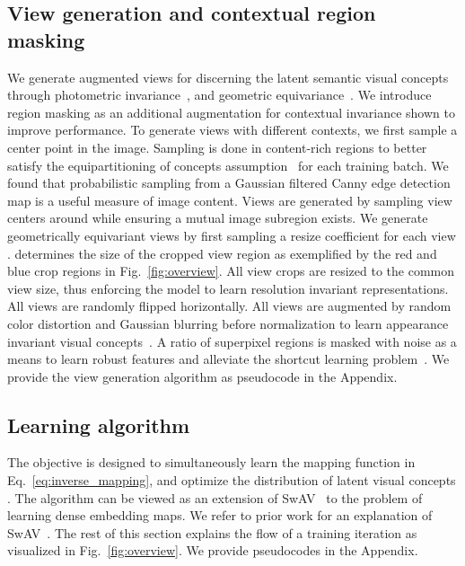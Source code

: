 \documentclass{bmvc2k}
\begin{document}
\subsection{View generation and contextual region masking}
\label{sec:view_generation}
We generate augmented views for discerning the latent semantic visual concepts through photometric invariance~\cite{Chen2020SimCLR}, and geometric equivariance~\cite{Cho2021PiCIE}. We introduce region masking as an additional augmentation for contextual invariance shown to improve performance.
To generate views with different contexts, we first sample a center point  in the image. Sampling is done in content-rich regions to better satisfy the equipartitioning of concepts assumption~\cite{Asano2020SeLA, Caron2020SwAV} for each training batch. We found that probabilistic sampling from a Gaussian filtered Canny edge detection map\cite{Canny1986CannyEdge} is a useful measure of image content. Views  are generated by sampling  view centers  around  while ensuring a mutual image subregion exists.
We generate geometrically equivariant views by first sampling a resize coefficient  for each view .  determines the size of the cropped view region as exemplified by the red and blue crop regions in Fig.~\ref{fig:overview}. All view crops are resized to the common view size, thus enforcing the model to learn resolution invariant representations. All views are randomly flipped horizontally.
All views are augmented by random color distortion and Gaussian blurring before normalization to learn appearance invariant visual concepts~\cite{Chen2020SimCLR, Xiao2021WhatShouldNot, Wen2021TowardUnderstanding}. A ratio of superpixel regions is masked with noise as a means to learn robust features and alleviate the shortcut learning problem~\cite{Geirhos2020ShortcutLearning}. We provide the view generation algorithm as pseudocode in the Appendix.

\subsection{Learning algorithm}

The objective  is designed to simultaneously learn the mapping function  in Eq.~\ref{eq:inverse_mapping}, and optimize the distribution of latent visual concepts . The algorithm can be viewed as an extension of SwAV~\cite{Caron2020SwAV} to the problem of learning dense embedding maps. We refer to prior work for an explanation of SwAV~\cite{Caron2020SwAV, Asano2020SeLA, Cuturi2013OptimalTransport, Kaiser2021UnderstandingSwAV}. The rest of this section explains the flow of a training iteration as visualized in Fig.~\ref{fig:overview}. We provide pseudocodes in the Appendix.
\end{document}
